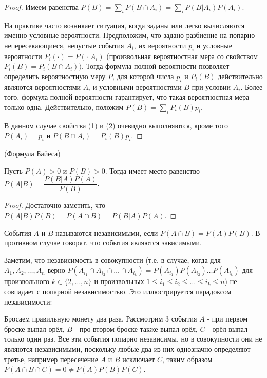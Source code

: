 \documentclass[a4paper]{article}
\begin{document}
\begin{colloq}
   	\begin{proof}
   		Имеем равенства $P(B) = \sum_i P(B \cap A_i) = \sum_i P(B|A_i)P(A_i)$.
   		
   		
   		На практике часто возникает ситуация, когда заданы или легко вычисляются именно	условные вероятности. Предположим, что задано разбиение на попарно непересекающиеся, непустые события $A_i$, их вероятности $p_i$ и условные вероятности $P_i(\cdot) = P(\cdot|A_i)$ (произвольная вероятностная мера со свойством $P_i(B) = P_i(B \cap A_i))$. Тогда формула полной вероятности позволяет определить вероятностную меру $P$, для которой числа $p_i$ и $P_i(B)$ действительно являются вероятностями $A_i$ и условными вероятностями $B$ при условии $A_i$. Более того, формула полной вероятности гарантирует, что такая вероятностная	мера только одна.
   		Действительно, положим $P(B) = \sum_i P_i(B)p_i$.
   		
   		В данном случае свойства (1) и (2) очевидно выполняются, кроме того $P(A_i) = p_i$ и $P(B \cap A_i) = P_i(B)p_i$.
   	\end{proof}
   
	\begin{theorem*} (Формула Байеса)
		
		Пусть $P(A) > 0$ и $P(B) > 0$. Тогда имеет место равенство $P(A|B) = \dfrac{P(B|A)P(A)}{P(B)}$.
	\end{theorem*}

	\begin{proof}
		Достаточно заметить, что $P(A|B)P(B) = P(A \cap B) = P(B|A)P(A)$.
	\end{proof}

	\begin{definition*}
		События $A$ и $B$ называются независимыми, если $P(A \cap B) = P(A)P(B)$. В противном случае говорят, что события являются зависимыми.
	\end{definition*}

	Заметим, что независимость в совокупности (т.е. в случае, когда для $A_1, A_2, \dots, A_n$ верно $P(A_{i_1} \cap A_{i_2} \cap \dots \cap A_{i_k}) = P(A_{i_1})P(A_{i_2}) \dots P(A_{i_k})$ для произвольного $k \in \{2, \dots, n\}$ и произвольных $1 \leqslant i_1 \leqslant i_2 \leqslant \dots \leqslant i_k \leqslant n$) не совпадает с попарной независимостью. Это иллюстрируется парадоксом независимости:
	
	Бросаем правильную монету два раза. Рассмотрим 3 события $A$ - при первом броске выпал орёл, $B$ - про втором броске также выпал орёл, $C$ - орёл выпал только один раз. Все эти события попарно независимы, но в совокупности они не являются независимыми, поскольку любые два из них однозначно определяют третье, например пересечение $A$ и $B$ исключает $C$, таким образом $P(A \cap B \cap C) = 0 \neq P(A)P(B)P(C)$.
	

\end{colloq}
\end{document}
